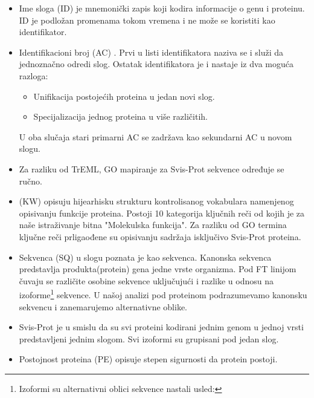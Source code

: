 \begin{itemize}
  \item Ime sloga (ID)  je mnemonički zapis koji kodira
    informacije o genu i proteinu. ID je podložan promenama tokom vremena
    i ne može se koristiti kao identifikator.
  \item Identifikacioni broj (AC) . Prvi u listi
    identifikatora naziva se  i služi da jednoznačno odredi
    slog. Ostatak identifikatora je  i nastaje iz dva
    moguća razloga:
    \begin{itemize}
      \item Unifikacija postojećih proteina u jedan novi slog. 
      \item Specijalizacija jednog proteina u više različitih.
    \end{itemize}
    U oba slučaja stari primarni AC se zadržava kao sekundarni AC u novom slogu.

  \item Za razliku od TrEML, GO mapiranje za Svis-Prot sekvence određuje se ručno.

  \item {}  (KW) opisuju hijearhisku strukturu
    kontrolisanog vokabulara namenjenog opisivanju funkcije proteina. Postoji
    10 kategorija ključnih reči od kojih je za naše istraživanje bitna
    "Molekulska funkcija".  Za razliku od GO termina ključne reči prligaođene
    su opisivanju sadržaja isključivo Svis-Prot proteina.

  \item Sekvenca (SQ) u slogu poznata je kao  
    sekvenca. Kanonska sekvenca predstavlja produkta(protein) gena jedne vrste
    organizma.  Pod FT linijom čuvaju se različite osobine sekvence uključujući
    i razlike u odnosu na izoforme\footnote{Izoformi su alternativni oblici
      sekvence nastali usled:  } sekvence.
    U našoj analizi pod proteinom podrazumevamo kanonsku sekvencu i
    zanemarujemo alternativne oblike.

  \item Svis-Prot je  u smislu da su svi proteini
    kodirani jednim genom u jednoj vrsti predstavljeni jednim slogom. Svi
    izoformi su grupisani pod jedan slog.

  \item Postojnost proteina (PE)  opisuje stepen
    sigurnosti da protein postoji.


\end{itemize}
